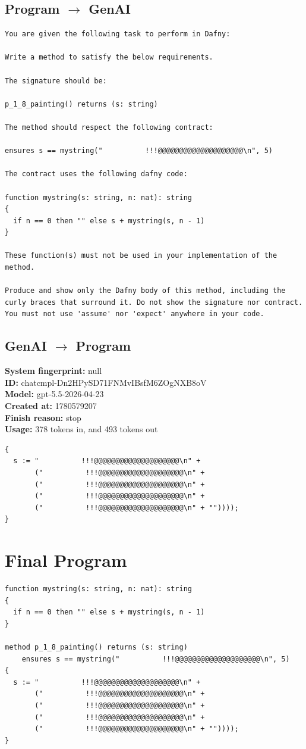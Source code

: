\documentclass{article}
\begin{document}
\subsection*{Program $\rightarrow$ GenAI}
\begin{lstlisting}
You are given the following task to perform in Dafny:

Write a method to satisfy the below requirements.

The signature should be:

p_1_8_painting() returns (s: string)

The method should respect the following contract:

ensures s == mystring("          !!!@@@@@@@@@@@@@@@@@@@@\n", 5)

The contract uses the following dafny code:

function mystring(s: string, n: nat): string
{
  if n == 0 then "" else s + mystring(s, n - 1)
}

These function(s) must not be used in your implementation of the method.

Produce and show only the Dafny body of this method, including the curly braces that surround it. Do not show the signature nor contract. You must not use 'assume' nor 'expect' anywhere in your code.
\end{lstlisting}
\subsection*{GenAI $\rightarrow$ Program}
\textbf{System fingerprint: }null
\\\textbf{ID: }chatcmpl-Dn2HPySD71FNMvIBsfM6ZOgNXB8oV
\\\textbf{Model: }gpt-5.5-2026-04-23
\\\textbf{Created at: }1780579207
\\\textbf{Finish reason: }stop
\\\textbf{Usage: }378 tokens in, and 493 tokens out
\begin{lstlisting}
{
  s := "          !!!@@@@@@@@@@@@@@@@@@@@\n" +
       ("          !!!@@@@@@@@@@@@@@@@@@@@\n" +
       ("          !!!@@@@@@@@@@@@@@@@@@@@\n" +
       ("          !!!@@@@@@@@@@@@@@@@@@@@\n" +
       ("          !!!@@@@@@@@@@@@@@@@@@@@\n" + ""))));
}
\end{lstlisting}
\section*{Final Program}
\begin{lstlisting}
function mystring(s: string, n: nat): string
{
  if n == 0 then "" else s + mystring(s, n - 1)
}

method p_1_8_painting() returns (s: string)
	ensures s == mystring("          !!!@@@@@@@@@@@@@@@@@@@@\n", 5)
{
  s := "          !!!@@@@@@@@@@@@@@@@@@@@\n" +
       ("          !!!@@@@@@@@@@@@@@@@@@@@\n" +
       ("          !!!@@@@@@@@@@@@@@@@@@@@\n" +
       ("          !!!@@@@@@@@@@@@@@@@@@@@\n" +
       ("          !!!@@@@@@@@@@@@@@@@@@@@\n" + ""))));
}
\end{lstlisting}
\end{document}
